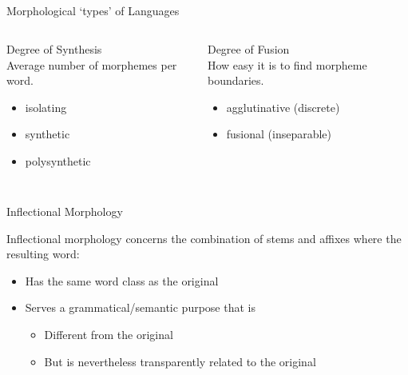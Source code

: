 \documentclass[9pt,xcolor=pdftex,dvipsnames,table]{beamer}
\begin{document}
\subsection{}
\begin{frame}{Morphological `types' of Languages}

	\begin{columns}[t]
		\begin{column}{0.5\textwidth}
		{\large Degree of Synthesis}\\
		\vspace{.5cm}
		Average number of morphemes per word.

		\begin{itemize}
			\item isolating
			\item synthetic
			\item polysynthetic
		\end{itemize}
		\end{column}

		\begin{column}{0.5\textwidth}
		{\large Degree of Fusion}\\
		\vspace{.5cm}
		How easy it is to find morpheme boundaries.

		\begin{itemize}
			\item agglutinative (discrete)
			\item fusional (inseparable)
		\end{itemize}
		\end{column}
	\end{columns}
\end{frame}

\subsection{}
\begin{frame}{Inflectional Morphology}

	{\large Inflectional morphology concerns the combination of stems and affixes where the resulting word:}
	\vspace{1cm}
	\begin{itemize}
		\item Has the same word class as the original
		\item Serves a grammatical/semantic purpose that is
		\vspace{.5cm}
	
		\begin{itemize}
			\item Different from the original
			\item But is nevertheless transparently related to the original
		\end{itemize}
	\end{itemize}
\end{frame}
\end{document}
